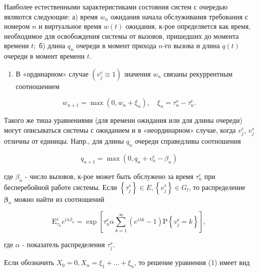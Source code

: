 \documentclass[10pt]{article}
\begin{document}
Наиболее естественными характеристиками состояния систем с очередью являются следующие: а) время $w_{n}$ ожидания начала обслуживания требования с номером $n$ и виртуальное время $w(t)$ ожидания, к-рое определяется как время, необходимое для освобождения системы от вызовов, пришедших до момента времени $t ;$ б) длина $q_{n}$ очереди в момент прихода $n$-го вызова и длина $q(t)$ очереди в момент времени $t$.



\begin{enumerate}

  \item В «ординарном» случае $\left(v_{j}^{e} \equiv 1\right)$ значения $w_{n}$ связаны рекуррентным соотношением

\end{enumerate}



\[

w_{n+1}=\max \left(0, w_{n}+\xi_{n}\right), \quad \xi_{n}=\tau_{n}^{s}-\tau_{n}^{e} .

\]



Такого же тиша уравнениями (для времени ожидания или для длины очереди) могут описываться системы с ожиданием и в «неординарном» случае, когда $v_{j}^{e}$, $v_{j}^{s}$ отличны от единицы. Напр., для длины $q_{n}$ очереди справедливы соотношения



\[

q_{n+1}=\max \left(0, q_{n}+v_{n}^{e}-\beta_{n}\right)

\]



где $\beta_{n}$ - число вызовов, к-рое может быть обслужено за время $\tau_{n}^{e}$ при бесперебойной работе системы. Если $\left\{\tau_{j}^{s}\right\} \in E,\left\{v_{j}^{s}\right\} \in G_{l}$, то распределение $\boldsymbol{\beta}_{n}$ можно найти из соотношений



\[

\mathrm{E}_{\tau_{n}}^{e} e^{i \lambda \beta_{n}}=\exp \left[\tau_{n}^{e} \alpha \sum_{k=1}^{\infty}\left(e^{i \lambda k}-1\right) \mathrm{P}\left\{v_{j}^{\mathrm{s}}=k\right\}\right],

\]



где $\alpha$ - показатель распределения $\tau_{j}^{s}$.



Если обозначить $X_{0}=0, X_{n}=\xi_{1}+\ldots+\xi_{n}$, то решение уравнения (1) имеет вид
\end{document}
